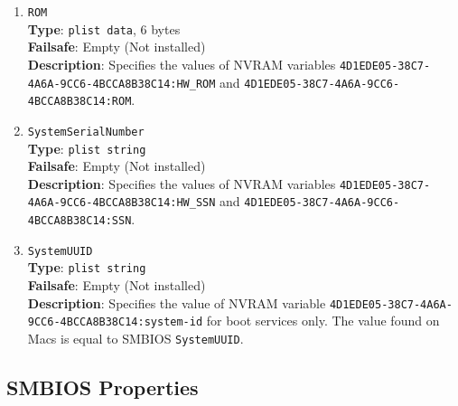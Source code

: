 \documentclass[]{article}
\begin{document}
\begin{enumerate}
\item
  \texttt{ROM}\\
  \textbf{Type}: \texttt{plist\ data}, 6 bytes\\
  \textbf{Failsafe}: Empty (Not installed)\\
  \textbf{Description}: Specifies the values of NVRAM variables
  \texttt{4D1EDE05-38C7-4A6A-9CC6-4BCCA8B38C14:HW\_ROM} and
  \texttt{4D1EDE05-38C7-4A6A-9CC6-4BCCA8B38C14:ROM}.

\item
  \texttt{SystemSerialNumber}\\
  \textbf{Type}: \texttt{plist\ string}\\
  \textbf{Failsafe}: Empty (Not installed)\\
  \textbf{Description}: Specifies the values of NVRAM variables
  \texttt{4D1EDE05-38C7-4A6A-9CC6-4BCCA8B38C14:HW\_SSN} and
  \texttt{4D1EDE05-38C7-4A6A-9CC6-4BCCA8B38C14:SSN}.

\item
  \texttt{SystemUUID}\\
  \textbf{Type}: \texttt{plist\ string}\\
  \textbf{Failsafe}: Empty (Not installed)\\
  \textbf{Description}: Specifies the value of NVRAM variable
  \texttt{4D1EDE05-38C7-4A6A-9CC6-4BCCA8B38C14:system-id}
  for boot services only. The value found on Macs is equal to SMBIOS
  \texttt{SystemUUID}.

\end{enumerate}

\subsection{SMBIOS Properties}\label{platforminfosmbios}
\end{document}
